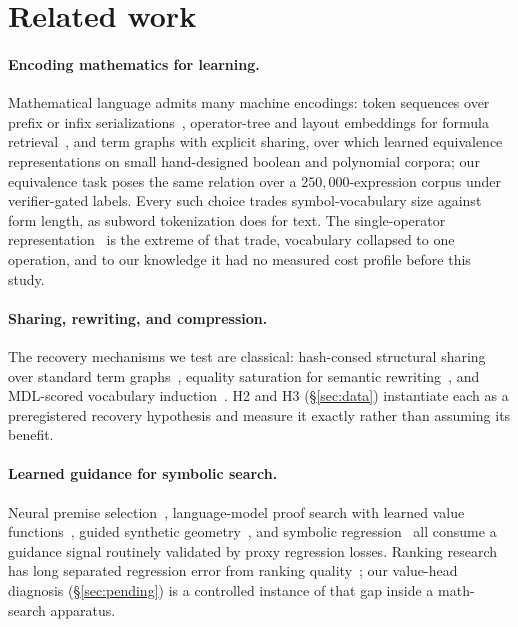 \documentclass[11pt]{article}
\begin{document}
\section{Related work}
\label{sec:related}

\paragraph{Encoding mathematics for learning.} Mathematical language admits many
machine encodings: token sequences over prefix or infix
serializations~\cite{lample2020deep,saxton2019analysing}, operator-tree and
layout embeddings for formula retrieval~\cite{mansouri2019tangentcft}, and term
graphs with explicit sharing, over which \citet{allamanis2017learning} learned
equivalence representations on small hand-designed boolean and polynomial
corpora; our equivalence task poses the same relation over a
$250{,}000$-expression corpus under verifier-gated labels.
Every such choice trades symbol-vocabulary size against form length, as subword
tokenization does for text. The single-operator
representation~\cite{odrzywolek2026} is the extreme of that trade, vocabulary
collapsed to one operation, and to our knowledge it had no measured cost
profile before this study.

\paragraph{Sharing, rewriting, and compression.} The recovery mechanisms we
test are classical: hash-consed structural
sharing~\cite{ershov1958,filliatre2006} over standard term
graphs~\cite{barendregt1987}, equality saturation for semantic
rewriting~\cite{tate2009equality,willsey2021egg}, and MDL-scored vocabulary
induction~\cite{rissanen1978}. H2 and H3 (\S\ref{sec:data}) instantiate each as
a preregistered recovery hypothesis and measure it exactly rather than assuming
its benefit.

\paragraph{Learned guidance for symbolic search.} Neural premise
selection~\cite{irving2016deepmath}, language-model proof search with learned
value functions~\cite{polu2020generative,lample2022hypertree}, guided synthetic
geometry~\cite{trinh2024solving}, and symbolic
regression~\cite{udrescu2020ai} all consume a guidance signal routinely
validated by proxy regression losses. Ranking research has long separated
regression error from ranking quality~\cite{burges2005learning}; our value-head
diagnosis (\S\ref{sec:pending}) is a controlled instance of that gap inside a
math-search apparatus.
\end{document}
